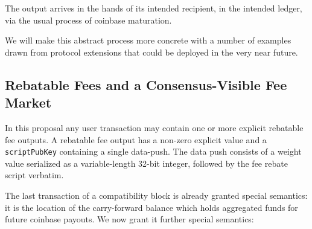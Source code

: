 The output arrives in the hands of its intended recipient, in the
intended ledger, via the usual process of coinbase maturation.

We will make this abstract process more concrete with a number of
examples drawn from protocol extensions that could be deployed in the
very near future.

\subsection{Rebatable Fees and a Consensus-Visible Fee Market} \label{rebatablefee}

In this proposal any user transaction may contain one or more explicit
rebatable fee outputs.  A rebatable fee output has a non-zero explicit
value and a {\tt scriptPubKey} containing a single data-push.  The
data push consists of a weight value serialized as a variable-length
32-bit integer, followed by the fee rebate script verbatim.

The last transaction of a compatibility block is already granted
special semantics: it is the location of the carry-forward balance
which holds aggregated funds for future coinbase payouts.  We now
grant it further special semantics:

